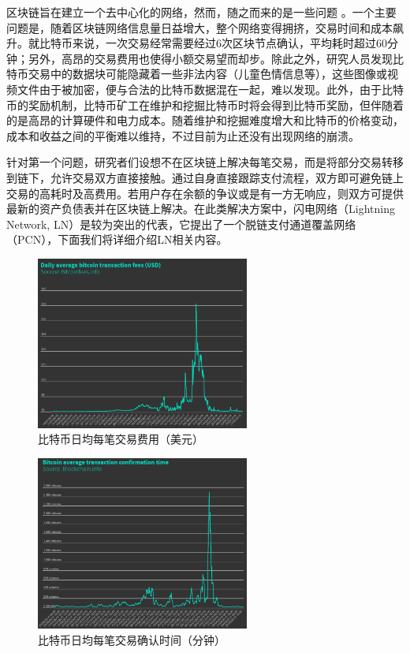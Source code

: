 \documentclass[12pt,a4paper]{article}
\begin{document}
区块链旨在建立一个去中心化的网络，然而，随之而来的是一些问题 \cite{blockchain_problem}。一个主要问题是，随着区块链网络信息量日益增大，整个网络变得拥挤，交易时间和成本飙升。就比特币来说，一次交易经常需要经过6次区块节点确认，平均耗时超过60分钟；另外，高昂的交易费用也使得小额交易望而却步。除此之外，研究人员发现比特币交易中的数据块可能隐藏着一些非法内容（儿童色情信息等），这些图像或视频文件由于被加密，便与合法的比特币数据混在一起，难以发现。此外，由于比特币的奖励机制，比特币矿工在维护和挖掘比特币时将会得到比特币奖励，但伴随着的是高昂的计算硬件和电力成本。随着维护和挖掘难度增大和比特币的价格变动，成本和收益之间的平衡难以维持，不过目前为止还没有出现网络的崩溃。

针对第一个问题，研究者们设想不在区块链上解决每笔交易，而是将部分交易转移到链下，允许交易双方直接接触。通过自身直接跟踪支付流程，双方即可避免链上交易的高耗时及高费用。若用户存在余额的争议或是有一方无响应，则双方可提供最新的资产负债表并在区块链上解决。在此类解决方案中，闪电网络（Lightning Network, LN）是较为突出的代表，它提出了一个脱链支付通道覆盖网络（PCN），下面我们将详细介绍LN相关内容。


\begin{figure}[htb]
\centering
\includegraphics[width=7cm]{fee}
\caption{比特币日均每笔交易费用（美元）}
\end{figure}

\begin{figure}[htb]
\centering
\includegraphics[width=7cm]{time}
\caption{比特币日均每笔交易确认时间（分钟）}
\end{figure}
\end{document}
